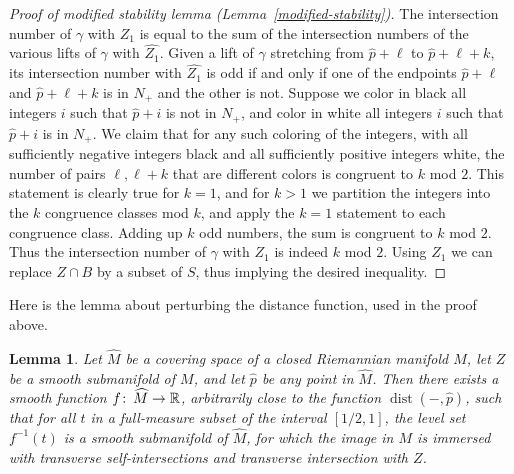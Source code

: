 \documentclass[12pt]{amsart}
\makeatletter
\newtheorem*{rep@theorem}{{Lemma} \ref##}
\newtheorem{lem}[dfn]{Lemma}
	{\newenvironment{rep{lem}}[1]{ } \begin{rep@theorem}} \end{rep@theorem}}
\numberwithin{equation}{section}
\makeatother
\begin{document}
\begin{proof}[Proof of modified stability lemma (Lemma~\ref{modified-stability})]
The intersection number of $\gamma$ with $Z_1$ is equal to the sum of the intersection numbers of the various lifts of $\gamma$ with $\widehat{Z_1}$.  Given a lift of $\gamma$ stretching from $\widehat{p} + \ell$ to $\widehat{p} + \ell + k$, its intersection number with $\widehat{Z_1}$ is odd if and only if one of the endpoints $\widehat{p} + \ell$ and $\widehat{p} + \ell + k$ is in $N_+$ and the other is not.  Suppose we color in black all integers $i$ such that $\widehat{p} + i$ is not in $N_+$, and color in white all integers $i$ such that $\widehat{p} + i$ is in $N_+$.  We claim that for any such coloring of the integers, with all sufficiently negative integers black and all sufficiently positive integers white, the number of pairs $\ell, \ell + k$ that are different colors is congruent to $k$ mod $2$.  This statement is clearly true for $k = 1$, and for $k > 1$ we partition the integers into the $k$ congruence classes mod $k$, and apply the $k = 1$ statement to each congruence class.  Adding up $k$ odd numbers, the sum is congruent to $k$ mod $2$.  Thus the intersection number of $\gamma$ with $Z_1$ is indeed $k$ mod $2$.  Using $Z_1$ we can replace $Z \cap B$ by a subset of $S$, thus implying the desired inequality.
\end{proof}

Here is the lemma about perturbing the distance function, used in the proof above.

\begin{lem}\label{lem-transverse}
 Let $\widehat{M}$ be a covering space of a closed Riemannian manifold $M$, let $Z$ be a smooth submanifold of $M$, and let $\widehat{p}$ be any point in $\widehat{M}$.  Then there exists a smooth function $f {\colon\thinspace} \widehat{M} \rightarrow \mathbb{R}$, arbitrarily close to the function $\operatorname{dist}(-, \widehat{p})$, such that for all $t$ in a full-measure subset of the interval $[1/2, 1]$, the level set $f^{-1}(t)$ is a smooth submanifold of $\widehat{M}$, for which the image in $M$ is immersed with transverse self-intersections and transverse intersection with $Z$.
\end{lem}
\end{document}

